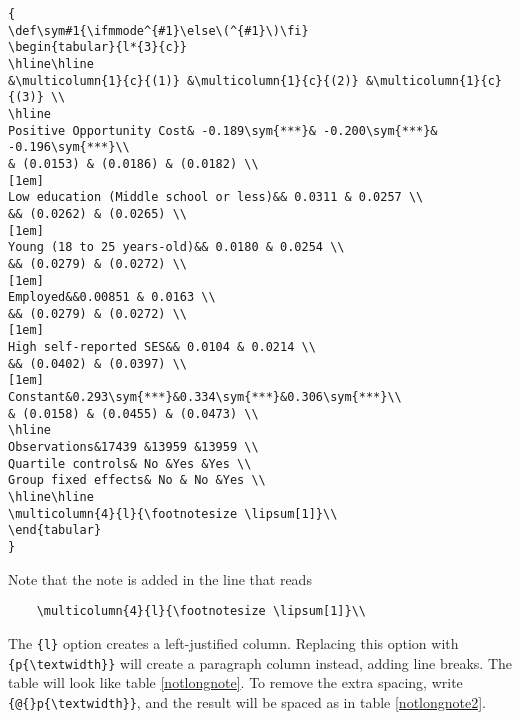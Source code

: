 \documentclass[11pt,a4paper]{article}
\begin{document}
\begin{verbatim}
{
\def\sym#1{\ifmmode^{#1}\else\(^{#1}\)\fi}
\begin{tabular}{l*{3}{c}}
\hline\hline
&\multicolumn{1}{c}{(1)} &\multicolumn{1}{c}{(2)} &\multicolumn{1}{c}{(3)} \\
\hline
Positive Opportunity Cost& -0.189\sym{***}& -0.200\sym{***}& -0.196\sym{***}\\
& (0.0153) & (0.0186) & (0.0182) \\
[1em]
Low education (Middle school or less)&& 0.0311 & 0.0257 \\
&& (0.0262) & (0.0265) \\
[1em]
Young (18 to 25 years-old)&& 0.0180 & 0.0254 \\
&& (0.0279) & (0.0272) \\
[1em]
Employed&&0.00851 & 0.0163 \\
&& (0.0279) & (0.0272) \\
[1em]
High self-reported SES&& 0.0104 & 0.0214 \\
&& (0.0402) & (0.0397) \\
[1em]
Constant&0.293\sym{***}&0.334\sym{***}&0.306\sym{***}\\
& (0.0158) & (0.0455) & (0.0473) \\
\hline
Observations&17439 &13959 &13959 \\
Quartile controls& No &Yes &Yes \\
Group fixed effects& No & No &Yes \\
\hline\hline
\multicolumn{4}{l}{\footnotesize \lipsum[1]}\\
\end{tabular}
}
\end{verbatim}


Note that the note is added in the line that reads 

\begin{verbatim}
	\multicolumn{4}{l}{\footnotesize \lipsum[1]}\\
\end{verbatim}

The \texttt{\{l\}} option creates a left-justified column. Replacing this option with \texttt{\{p\{\textbackslash textwidth\}\}} will create a paragraph column instead, adding line breaks. The table will look like table \ref{notlongnote}. To remove the extra spacing, write \texttt{\{@\{\}p\{\textbackslash textwidth\}\}}, and the result will be spaced as in table \ref{notlongnote2}.
\end{document}
